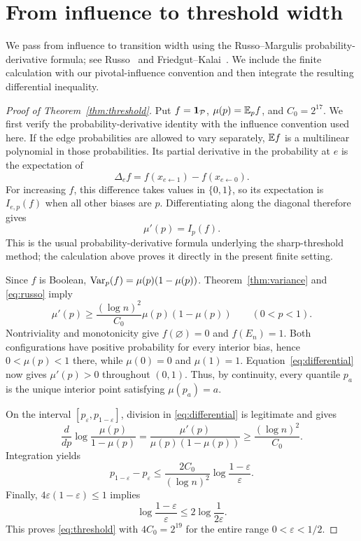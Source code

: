 \section{From influence to threshold width}
\label{sec:threshold}

We pass from influence to transition width using the Russo--Margulis
probability-derivative formula; see Russo~\cite[Lemma~3]{Russo81}
and Friedgut--Kalai~\cite[Lemma~2.2]{FK96}. We include the finite
calculation with our pivotal-influence convention and then integrate
the resulting differential inequality.

\begin{proof}[Proof of Theorem~\ref{thm:threshold}]
Put $f=\mathbf 1_{\mathcal P}$, $\mu(p)=\mathbb E_p f$, and $C_0=2^{17}$. We first verify the probability-derivative identity with the influence convention used here. If the edge probabilities are allowed to vary separately, $\mathbb E f$ is a multilinear polynomial in those probabilities. Its partial derivative in the probability at $e$ is the expectation of
\[
 \Delta_e f=f(x_{e\leftarrow1})-f(x_{e\leftarrow0}).
\]
For increasing $f$, this difference takes values in $\{0,1\}$, so its expectation is $I_{e,p}(f)$ when all other biases are $p$. Differentiating along the diagonal therefore gives
\begin{equation}
\label{eq:russo}
 \mu'(p)=I_p(f).
\end{equation}
This is the usual probability-derivative formula underlying the sharp-threshold method; the calculation above proves it directly in the present finite setting.

Since $f$ is Boolean, $\operatorname{Var}_p(f)=\mu(p)(1-\mu(p))$. Theorem~\ref{thm:variance} and \eqref{eq:russo} imply
\begin{equation}
\label{eq:differential}
 \mu'(p)\ge \frac{(\log n)^2}{C_0}\mu(p)(1-\mu(p))
 \qquad(0<p<1).
\end{equation}
Nontriviality and monotonicity give $f(\varnothing)=0$ and $f(E_n)=1$. Both configurations have positive probability for every interior bias, hence $0<\mu(p)<1$ there, while $\mu(0)=0$ and $\mu(1)=1$. Equation~\eqref{eq:differential} now gives $\mu'(p)>0$ throughout $(0,1)$. Thus, by continuity, every quantile $p_a$ is the unique interior point satisfying $\mu(p_a)=a$.

On the interval $[p_\varepsilon,p_{1-\varepsilon}]$, division in \eqref{eq:differential} is legitimate and gives
\[
 \frac{d}{dp}\log\frac{\mu(p)}{1-\mu(p)}
 =\frac{\mu'(p)}{\mu(p)(1-\mu(p))}
 \ge\frac{(\log n)^2}{C_0}.
\]
Integration yields
\[
 p_{1-\varepsilon}-p_\varepsilon
 \le\frac{2C_0}{(\log n)^2}
          \log\frac{1-\varepsilon}{\varepsilon}.
\]
Finally, $4\varepsilon(1-\varepsilon)\le1$ implies
\[
 \log\frac{1-\varepsilon}{\varepsilon}
 \le 2\log\frac1{2\varepsilon}.
\]
This proves \eqref{eq:threshold} with $4C_0=2^{19}$ for the entire range $0<\varepsilon<1/2$.
\end{proof}

